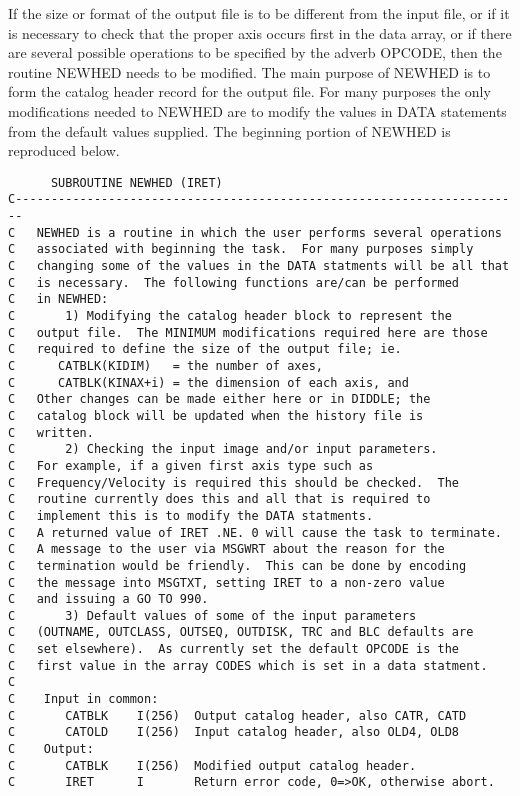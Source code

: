 If the size or format of the output file is to be different from the
input file, or if it is necessary to check that the proper axis occurs
first in the data array, or if there are several possible operations
to be specified by the adverb OPCODE, then the routine NEWHED needs to
be modified.  The main purpose of NEWHED is to form the catalog header
record for the output file.  For many purposes the only modifications
needed to NEWHED are to  modify the values in DATA statements from the
default values supplied.  The beginning portion of NEWHED is
reproduced below.

\begin{verbatim}
      SUBROUTINE NEWHED (IRET)
C-----------------------------------------------------------------------
C   NEWHED is a routine in which the user performs several operations
C   associated with beginning the task.  For many purposes simply
C   changing some of the values in the DATA statments will be all that
C   is necessary.  The following functions are/can be performed
C   in NEWHED:
C       1) Modifying the catalog header block to represent the
C   output file.  The MINIMUM modifications required here are those
C   required to define the size of the output file; ie.
C      CATBLK(KIDIM)   = the number of axes,
C      CATBLK(KINAX+i) = the dimension of each axis, and
C   Other changes can be made either here or in DIDDLE; the
C   catalog block will be updated when the history file is
C   written.
C       2) Checking the input image and/or input parameters.
C   For example, if a given first axis type such as
C   Frequency/Velocity is required this should be checked.  The
C   routine currently does this and all that is required to
C   implement this is to modify the DATA statments.
C   A returned value of IRET .NE. 0 will cause the task to terminate.
C   A message to the user via MSGWRT about the reason for the
C   termination would be friendly.  This can be done by encoding
C   the message into MSGTXT, setting IRET to a non-zero value
C   and issuing a GO TO 990.
C       3) Default values of some of the input parameters
C   (OUTNAME, OUTCLASS, OUTSEQ, OUTDISK, TRC and BLC defaults are
C   set elsewhere).  As currently set the default OPCODE is the
C   first value in the array CODES which is set in a data statment.
C
C    Input in common:
C       CATBLK    I(256)  Output catalog header, also CATR, CATD
C       CATOLD    I(256)  Input catalog header, also OLD4, OLD8
C    Output:
C       CATBLK    I(256)  Modified output catalog header.
C       IRET      I       Return error code, 0=>OK, otherwise abort.

\end{verbatim}

